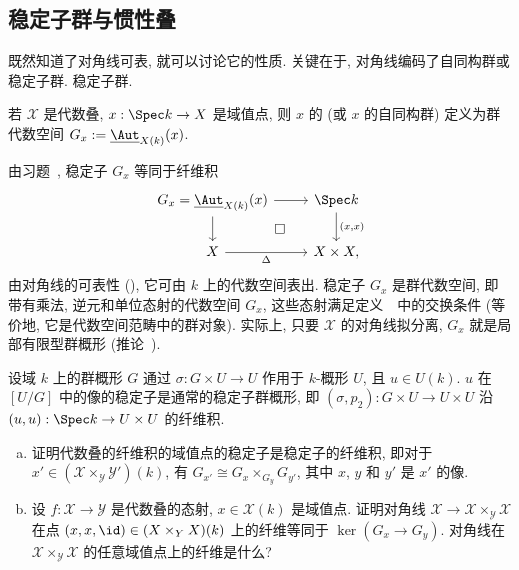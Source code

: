 \subsection{稳定子群与惯性叠}\label{src:4.2.2-subsection}
既然知道了对角线可表, 就可以讨论它的性质. 关键在于, 对角线编码了自同构群或稳定子群. 稳定子群.
\begin{definition}[稳定子]\label{src:4.2.5}
若 $\mathcal X$ 是代数叠, $x:\Spec k\to\mathcal X$ 是域值点, 则 $x$ 的 (或 $x$ 的自同构群) 定义为群代数空间 $G_x:=\underline{\Aut}_{\mathcal X(k)}(x)$.
\end{definition}
由习题~, 稳定子 $G_x$ 等同于纤维积
\[
\begin{tikzcd}
G_x=\underline{\Aut}_{\mathcal X(k)}(x)\arrow[r]\arrow[d]\arrow[dr,phantom,"\square"]&\Spec k\arrow[d,"{(x,x)}"]\\
\mathcal X\arrow[r,"\Delta"']&\mathcal X\times\mathcal X,
\end{tikzcd}
\]
由对角线的可表性 (), 它可由 $k$ 上的代数空间表出. 稳定子 $G_x$ 是群代数空间, 即带有乘法, 逆元和单位态射的代数空间 $G_x$, 这些态射满足定义~~中的交换条件 (等价地, 它是代数空间范畴中的群对象). 实际上, 只要 $\mathcal X$ 的对角线拟分离, $G_x$ 就是局部有限型群概形 (推论~).
\begin{remark}\label{src:4.2.6}
设域 $k$ 上的群概形 $G$ 通过 $\sigma:G\times U\to U$ 作用于 $k$-概形 $U$, 且 $u\in U(k)$. $u$ 在 $[U/G]$ 中的像的稳定子是通常的稳定子群概形, 即 $(\sigma,p_2):G\times U\to U\times U$ 沿 $(u,u):\Spec k\to U\times U$ 的纤维积.
\end{remark}
\begin{exercise}\label{src:4.2.7}
\begin{enumerate}[(a)]
\item 证明代数叠的纤维积的域值点的稳定子是稳定子的纤维积, 即对于 $x'\in(\mathcal X\times_{\mathcal Y}\mathcal Y')(k)$, 有 $G_{x'}\cong G_x\times_{G_y}G_{y'}$, 其中 $x$, $y$ 和 $y'$ 是 $x'$ 的像.
\item 设 $f:\mathcal X\to\mathcal Y$ 是代数叠的态射, $x\in\mathcal X(k)$ 是域值点. 证明对角线 $\mathcal X\to\mathcal X\times_{\mathcal Y}\mathcal X$ 在点 $(x,x,\id)\in(\mathcal X\times_{\mathcal Y}\mathcal X)(k)$ 上的纤维等同于 $\ker(G_x\to G_y)$. 对角线在 $\mathcal X\times_{\mathcal Y}\mathcal X$ 的任意域值点上的纤维是什么?
\end{enumerate}
\end{exercise}
